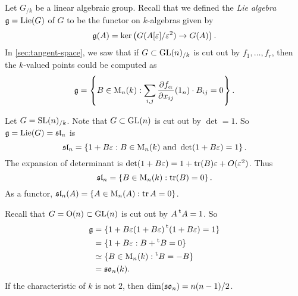 Let $G_{/k}$ be a linear algebraic group. Recall that we defined the \emph{Lie 
algebra} $\mathfrak{g}=\operatorname{Lie}(G)$ of $G$ to be the functor on $k$-algebras given by 
\[
  \mathfrak{g}(A) = \ker\left(G(A[\varepsilon]/\varepsilon^2) \to G(A)\right) .
\]
In \autoref{sec:tangent-space}, we saw that if $G\subset \operatorname{GL}(n)_{/k}$ is cut out by 
$f_1,\dots,f_r$, then the $k$-valued points could be computed as 
\[
  \mathfrak{g} = \left\{B\in \operatorname{M}_n(k):\sum_{i,j} \frac{\partial f_\alpha}{\partial x_{i j}}(1_n)\cdot B_{i j}=0\right\} .
\]

\begin{example}
Let $G=\operatorname{SL}(n)_{/k}$. Note that $G\subset \operatorname{GL}(n)$ is cut out by $\det=1$. So 
$\mathfrak{g}=\operatorname{Lie}(G)=\mathfrak{sl}_n$ is 
\[
  \mathfrak{sl}_n = \left\{1+B\varepsilon:B\in \operatorname{M}_n(k)\text{ and }\det(1+B\varepsilon)=1\right\} .
\]
The expansion of determinant is 
$\det(1+B\varepsilon)=1+\operatorname{tr}(B)\varepsilon + O(\varepsilon^2)$. Thus 
\[
  \mathfrak{sl}_n = \left\{B\in \operatorname{M}_n(k):\operatorname{tr}(B)=0\right\} .
\]
As a functor, $\mathfrak{sl}_n(A)=\{A\in \operatorname{M}_n(A):\operatorname{tr} A=0\}$. 
\end{example}

\begin{example}[Orthogonal]
Recall that $G=\operatorname{O}(n)\subset \operatorname{GL}(n)$ is cut out by $A \prescript{\mathrm{t}}{}{A}=1$. So 
\begin{align*}
  \mathfrak{g}
    &= \{1+B\varepsilon  (1+B\varepsilon) \prescript{\mathrm{t}}{}{(1+B\varepsilon)}=1\} \\
    &= \{1+B\varepsilon:B+\prescript{\mathrm{t}}{}{B}=0\} \\
    &\simeq \{B\in \operatorname{M}_n(k):\prescript{\mathrm{t}}{}{B}=-B\} \\
    &= \mathfrak{so}_n(k) .
\end{align*}
If the characteristic of $k$ is not $2$, then $\dim(\mathfrak{so}_n)=n(n-1)/2$. 
\end{example}

